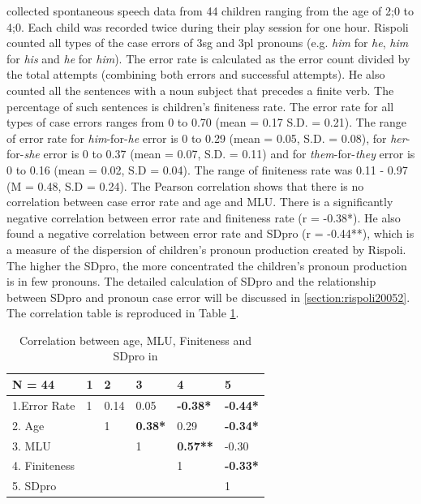 \cite{rispoli2005} collected spontaneous speech data from 44 children ranging from the age of 2;0 to 4;0. Each child was recorded twice during their play session for one hour. Rispoli counted all types of the case errors of 3sg and 3pl pronouns (e.g. \textit{him} for \textit{he}, \textit{him} for \textit{his} and \textit{he} for \textit{him}). The error rate is calculated as the error count divided by the total attempts (combining both errors and successful attempts). He also counted all the sentences with a noun subject that precedes a finite verb. The percentage of such sentences is children's finiteness rate. The error rate for all types of case errors ranges from 0 to 0.70 (mean = 0.17 S.D. = 0.21). The range of error rate for  \textit{him}-for-\textit{he} error is 0 to 0.29 (mean = 0.05, S.D. = 0.08), for \textit{her}-for-\textit{she} error is 0 to 0.37 (mean = 0.07, S.D. = 0.11) and for \textit{them}-for-\textit{they} error is 0 to 0.16 (mean =  0.02, S.D = 0.04). The range of finiteness rate was 0.11 - 0.97 (M = 0.48, S.D = 0.24). The Pearson correlation shows that there is no correlation between case error rate and age and MLU. There is a significantly negative correlation between error rate and finiteness rate (r = -0.38*). He also found a negative correlation between error rate and SDpro (r = -0.44**), which is a measure of the dispersion of children's pronoun production created by Rispoli. The higher the SDpro, the more concentrated the children's pronoun production is in few pronouns. The detailed calculation of SDpro and the relationship between SDpro and pronoun case error will be discussed in \ref{section:rispoli20052}. The correlation table is reproduced in Table \ref{tab:corRis}. 
\FloatBarrier
\begin{table}[!h]
\centering
\caption{Correlation between age, MLU, Finiteness and SDpro in \cite{rispoli2005}}
\label{tab:corRis}
\begin{tabular}{llllll}
\toprule
N = 44 & 1& 2 & 3 & 4 & 5 \\
 \hline
1.Error Rate & 1&  0.14 & 0.05 & \textbf{-0.38*} & \textbf{-0.44*} \\
2. Age &  &1& \textbf{0.38*} & 0.29 & \textbf{-0.34*} \\
3. MLU &  &  & 1&\textbf{0.57**} & -0.30 \\
4. Finiteness &  &  &  &1& \textbf{-0.33*}\\
5. SDpro& & & & & 1\\
\bottomrule
\end{tabular}
\end{table}
